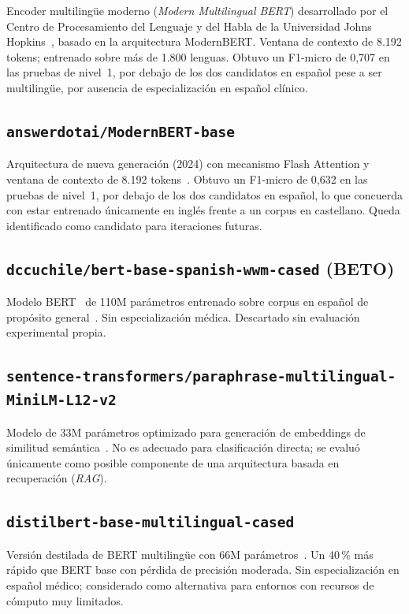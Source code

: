 Encoder multilingüe moderno (\emph{Modern Multilingual BERT}) desarrollado por el Centro de Procesamiento del Lenguaje y del Habla de la Universidad Johns Hopkins~\cite{marone2025mmbert}, basado en la arquitectura ModernBERT. Ventana de contexto de 8.192 tokens; entrenado sobre más de 1.800 lenguas. Obtuvo un F1-micro de 0{,}707 en las pruebas de nivel~1, por debajo de los dos candidatos en español pese a ser multilingüe, por ausencia de especialización en español clínico.

\subsection{\texttt{answerdotai/ModernBERT-base}}

Arquitectura de nueva generación (2024) con mecanismo Flash Attention y ventana de contexto de 8.192 tokens~\cite{warner2024modernbert}. Obtuvo un F1-micro de 0{,}632 en las pruebas de nivel~1, por debajo de los dos candidatos en español, lo que concuerda con estar entrenado únicamente en inglés frente a un corpus en castellano. Queda identificado como candidato para iteraciones futuras.

\subsection{\texttt{dccuchile/bert-base-spanish-wwm-cased} (BETO)}

Modelo BERT~\cite{devlin2019} de 110M parámetros entrenado sobre corpus en español de propósito general~\cite{canete2020beto}. Sin especialización médica. Descartado sin evaluación experimental propia.

\subsection{\texttt{sentence-transformers/paraphrase-multilingual-MiniLM-L12-v2}}

Modelo de 33M parámetros optimizado para generación de embeddings de similitud semántica~\cite{reimers2019sentencebert}. No es adecuado para clasificación directa; se evaluó únicamente como posible componente de una arquitectura basada en recuperación (\emph{RAG}).

\subsection{\texttt{distilbert-base-multilingual-cased}}

Versión destilada de BERT multilingüe con 66M parámetros~\cite{sanh2019distilbert}. Un 40\,\% más rápido que BERT base con pérdida de precisión moderada. Sin especialización en español médico; considerado como alternativa para entornos con recursos de cómputo muy limitados.


